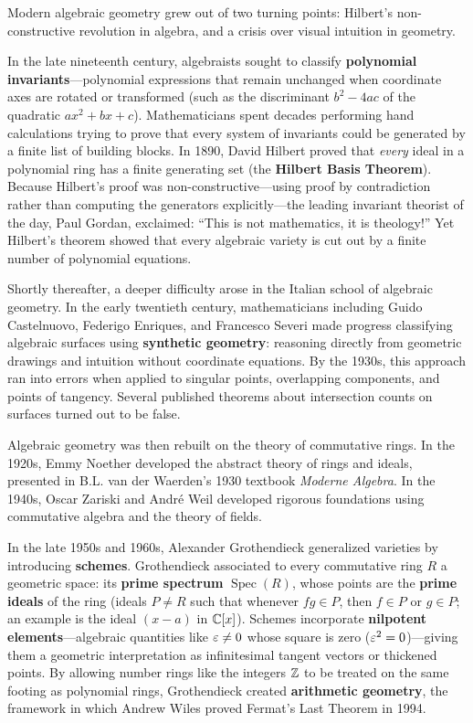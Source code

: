 \begin{historybox}
Modern algebraic geometry grew out of two turning points: Hilbert's non-constructive revolution in algebra, and a crisis over visual intuition in geometry.

In the late nineteenth century, algebraists sought to classify \textbf{polynomial invariants}---polynomial expressions that remain unchanged when coordinate axes are rotated or transformed (such as the discriminant $b^2 - 4ac$ of the quadratic $ax^2 + bx + c$). Mathematicians spent decades performing hand calculations trying to prove that every system of invariants could be generated by a finite list of building blocks. In 1890, David Hilbert proved that \emph{every} ideal in a polynomial ring has a finite generating set (the \textbf{Hilbert Basis Theorem}). Because Hilbert's proof was non-constructive---using proof by contradiction rather than computing the generators explicitly---the leading invariant theorist of the day, Paul Gordan, exclaimed: ``This is not mathematics, it is theology!'' Yet Hilbert's theorem showed that every algebraic variety is cut out by a finite number of polynomial equations.

Shortly thereafter, a deeper difficulty arose in the Italian school of algebraic geometry. In the early twentieth century, mathematicians including Guido Castelnuovo, Federigo Enriques, and Francesco Severi made progress classifying algebraic surfaces using \textbf{synthetic geometry}: reasoning directly from geometric drawings and intuition without coordinate equations. By the 1930s, this approach ran into errors when applied to singular points, overlapping components, and points of tangency. Several published theorems about intersection counts on surfaces turned out to be false.

Algebraic geometry was then rebuilt on the theory of commutative rings. In the 1920s, Emmy Noether developed the abstract theory of rings and ideals, presented in B.L. van der Waerden's 1930 textbook \emph{Moderne Algebra}. In the 1940s, Oscar Zariski and Andr\'e Weil developed rigorous foundations using commutative algebra and the theory of fields.

In the late 1950s and 1960s, Alexander Grothendieck generalized varieties by introducing \textbf{schemes}. Grothendieck associated to every commutative ring $R$ a geometric space: its \textbf{prime spectrum} $\operatorname{Spec}(R)$, whose points are the \textbf{prime ideals} of the ring (ideals $P \neq R$ such that whenever $fg \in P$, then $f \in P$ or $g \in P$; an example is the ideal $(x - a)$ in $\mathbb{C}[x]$). Schemes incorporate \textbf{nilpotent elements}---algebraic quantities like $\varepsilon \neq 0$ whose square is zero ($\varepsilon^2 = 0$)---giving them a geometric interpretation as infinitesimal tangent vectors or thickened points. By allowing number rings like the integers $\mathbb{Z}$ to be treated on the same footing as polynomial rings, Grothendieck created \textbf{arithmetic geometry}, the framework in which Andrew Wiles proved Fermat's Last Theorem in 1994.


\end{historybox}
